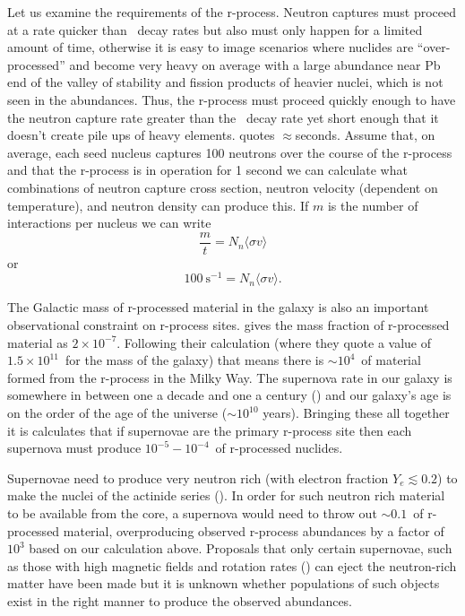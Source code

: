 {Let us examine the requirements of the r-process.  Neutron captures
must proceed at a rate quicker than \bminus\ decay rates but also must
only happen for a limited amount of time, otherwise it is easy to
image scenarios where nuclides are ``over-processed'' and become very
heavy on average with a large abundance near Pb end of the valley of
stability and fission products of heavier nuclei, which is not seen in
the abundances.  Thus, the r-process must proceed quickly enough to
have the neutron capture rate greater than the \bminus\ decay rate yet
short enough that it doesn't create pile ups of heavy
elements. \cite{iliadis2008} quotes $\approx$seconds.
 Assume that, on average, each seed nucleus captures
100 neutrons over the course of the r-process and that the r-process
is in operation for 1 second we can calculate what
combinations of neutron capture cross section, neutron velocity
(dependent on temperature), and
neutron density can produce this.  If $m$ is the number of
interactions per nucleus we can write
\begin{equation}
\frac{m}{t} = N_n \langle \sigma v \rangle
\end{equation}
or
\begin{equation}
100 ~\textrm{s}^{-1} = N_n \langle \sigma v \rangle.
\end{equation}

The Galactic mass of r-processed material in the galaxy is also an
important observational constraint on r-process
sites.  \cite{meyer1994} gives the mass fraction of r-processed
material as $2\times 10^{-7}$.  Following their calculation (where they
quote a value of $1.5\times10^{11}$\Msol\ for the mass of the galaxy)
that means there is $\sim 10^4$\Msol\ of material formed from the
r-process in the Milky Way.  The supernova rate in our galaxy is
somewhere in between one a decade and one a century
(\citealt{van1991}) and our galaxy's age is on the order of the age of
the universe ($\sim 10^{10}$ years).  Bringing these all together it
is calculates that if supernovae are the primary r-process site then
each supernova must produce $10^{-5}-10^{-4}$\Msol\ of r-processed
nuclides. 

Supernovae need to produce very neutron rich (with electron fraction
$Y_e\lesssim 0.2$) to make the nuclei of the actinide series
(\citealt{meyer1994}).  In order for such neutron rich material to be
available from the core, a supernova would need to  throw out $\sim 0.1$\Msol\ of
r-processed material, overproducing observed r-process abundances by a
factor of $10^3$ based on our calculation above.  Proposals that only
certain supernovae, such as those with high magnetic fields and
rotation rates (\citealt{symbalistyetal1985}) can eject the neutron-rich matter have
been made but it is unknown whether populations of such objects exist
in the right manner to produce the observed abundances. 

}
